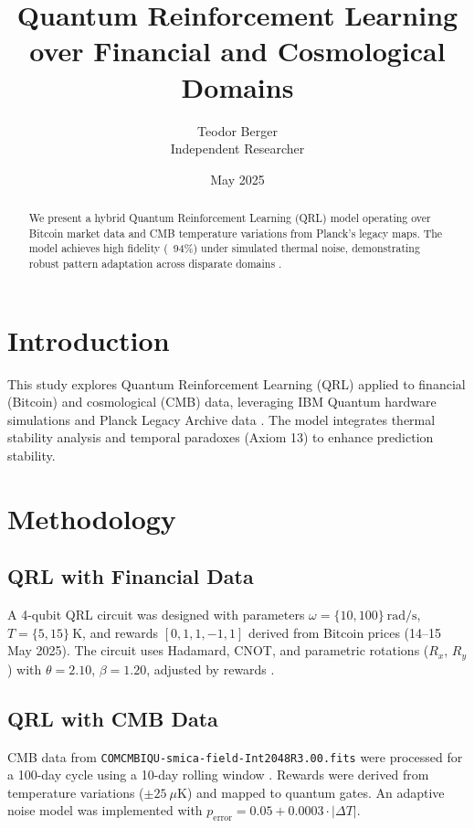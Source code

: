 \documentclass{article}
\title{Quantum Reinforcement Learning over Financial and Cosmological Domains}
\author{Teodor Berger \\ Independent Researcher}
\date{May 2025}
\begin{document}
\maketitle

\begin{abstract}
We present a hybrid Quantum Reinforcement Learning (QRL) model operating over Bitcoin market data and CMB temperature variations from Planck’s legacy maps. The model achieves high fidelity (~94\%) under simulated thermal noise, demonstrating robust pattern adaptation across disparate domains \cite{PlanckLegacy}.
\end{abstract}

\section{Introduction}
This study explores Quantum Reinforcement Learning (QRL) applied to financial (Bitcoin) and cosmological (CMB) data, leveraging IBM Quantum hardware simulations \cite{QiskitDocs} and Planck Legacy Archive data \cite{PlanckLegacy}. The model integrates thermal stability analysis and temporal paradoxes (Axiom 13) to enhance prediction stability.

\section{Methodology}
\subsection{QRL with Financial Data}
A 4-qubit QRL circuit was designed with parameters $\omega = \{10, 100\}~\text{rad/s}$, $T = \{5, 15\}~\text{K}$, and rewards $[0, 1, 1, -1, 1]$ derived from Bitcoin prices (14--15 May 2025). The circuit uses Hadamard, CNOT, and parametric rotations ($R_x$, $R_y$) with $\theta=2.10$, $\beta=1.20$, adjusted by rewards \cite{QiskitDocs}.

\subsection{QRL with CMB Data}
CMB data from \texttt{COM\discretionary{-}{}{}CMB\discretionary{-}{}{}IQU-smica-field-Int\discretionary{-}{}{}2048\discretionary{-}{}{}R3.00.fits} were processed for a 100-day cycle using a 10-day rolling window \cite{AstropyFITS}. Rewards were derived from temperature variations ($\pm 25~\mu$K) and mapped to quantum gates. An adaptive noise model was implemented with $p_{\text{error}} = 0.05 + 0.0003 \cdot |\Delta T|$.
\end{document}
